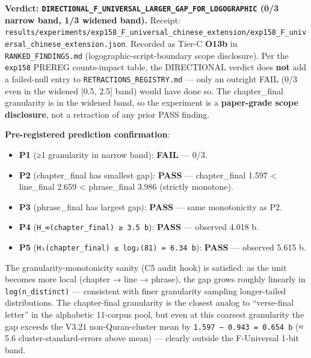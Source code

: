 \documentclass[
]{article}
\providecommand{\tightlist}{%
  \setlength{\itemsep}{0pt}\setlength{\parskip}{0pt}}
\begin{document}
\textbf{Verdict:
\texttt{DIRECTIONAL\_F\_UNIVERSAL\_LARGER\_GAP\_FOR\_LOGOGRAPHIC} (0/3
narrow band, 1/3 widened band).} Receipt:
\texttt{results/experiments/exp158\_F\_universal\_chinese\_extension/exp158\_F\_universal\_chinese\_extension.json}.
Recorded as Tier-C \textbf{O13b} in \texttt{RANKED\_FINDINGS.md}
(logographic-script-boundary scope disclosure). Per the \texttt{exp158}
PREREG counts-impact table, the DIRECTIONAL verdict does \textbf{not}
add a failed-null entry to \texttt{RETRACTIONS\_REGISTRY.md} --- only an
outright FAIL (0/3 even in the widened {[}0.5, 2.5{]} band) would have
done so. The chapter\_final granularity is in the widened band, so the
experiment is a \textbf{paper-grade scope disclosure}, not a retraction
of any prior PASS finding.

\textbf{Pre-registered prediction confirmation}:

\begin{itemize}
\tightlist
\item
  \textbf{P1} (≥1 granularity in narrow band): \textbf{FAIL} --- 0/3.
\item
  \textbf{P2} (chapter\_final has smallest gap): \textbf{PASS} ---
  chapter\_final 1.597 \textless{} line\_final 2.659 \textless{}
  phrase\_final 3.986 (strictly monotone).
\item
  \textbf{P3} (phrase\_final has largest gap): \textbf{PASS} --- same
  monotonicity as P2.
\item
  \textbf{P4} (\texttt{H\_∞(chapter\_final)\ ≥\ 3.5\ b}): \textbf{PASS}
  --- observed 4.018 b.
\item
  \textbf{P5} (\texttt{H₁(chapter\_final)\ ≤\ log₂(81)\ =\ 6.34\ b}):
  \textbf{PASS} --- observed 5.615 b.
\end{itemize}

The granularity-monotonicity sanity (C5 audit hook) is satisfied: as the
unit becomes more local (chapter → line → phrase), the gap grows roughly
linearly in \texttt{log(n\_distinct)} --- consistent with finer
granularity sampling longer-tailed distributions. The chapter-final
granularity is the closest analog to ``verse-final letter'' in the
alphabetic 11-corpus pool, but even at this coarsest granularity the gap
exceeds the V3.21 non-Quran-cluster mean by
\texttt{1.597\ −\ 0.943\ =\ 0.654\ b} (≈ 5.6 cluster-standard-errors
above mean) --- clearly outside the F-Universal 1-bit band.
\end{document}
